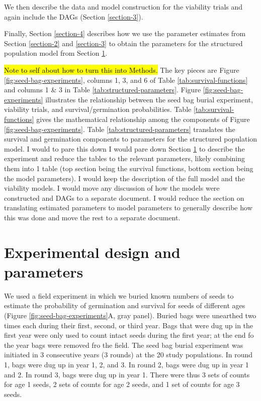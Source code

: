 \documentclass[12pt, oneside, titlepage]{article}   	%
\begin{document}
We then describe the data and model construction for the viability trials and again include the DAGs (Section \ref{section-3}).

Finally, Section \ref{section-4} describes how we use the parameter estimates from Section \ref{section-2} and \ref{section-3} to obtain the parameters for the structured population model from Section \ref{section-1}.

\hl{Note to self about how to turn this into Methods.} The key pieces are Figure \ref{fig:seed-bag-experiments}, columns 1, 3, and 6 of Table \ref{tab:survival-functions} and columns 1 \& 3 in Table \ref{tab:structured-parameters}. Figure \ref{fig:seed-bag-experiments} illustrates the relationship between the seed bag burial experiment, viability trials, and survival/germination probabilities. Table \ref{tab:survival-functions} gives the mathematical relationship among the components of Figure \ref{fig:seed-bag-experiments}. Table \ref{tab:structured-parameters} translates the survival and germination components to parameters for the structured population model. I would to pare this down I would pare down Section \ref{section-1} to describe the experiment and reduce the tables to the relevant parameters, likely combining them into 1 table (top section being the survival functions, bottom section being the model parameters). I would keep the description of the full model and the viability models. I would move any discussion of how the models were constructed and DAGs to a separate document. I would reduce the section on translating estimated parameters to model parameters to generally describe how this was done and move the rest to a separate document. 

\section{Experimental design and parameters}\label{section-1}

We used a field experiment in which we buried known numbers of seeds to estimate the probability of germination and survival for seeds of different ages (Figure \ref{fig:seed-bag-experiments}A, gray panel). Buried bags were unearthed two times each during their first, second, or third year. Bags that were dug up in the first year were only used to count intact seeds during the first year; at the end fo the year bags were removed fro the field. The seed bag burial experiment was initiated in 3 consecutive years (3 rounds) at the 20 study populations. In round 1, bags were dug up in year 1, 2, and 3. In round 2, bags were dug up in year 1 and 2. In round 3, bags were dug up in year 1. There were thus 3 sets of counts for age 1 seeds, 2 sets of counts for age 2 seeds, and 1 set of counts for age 3 seeds. 
\end{document}
